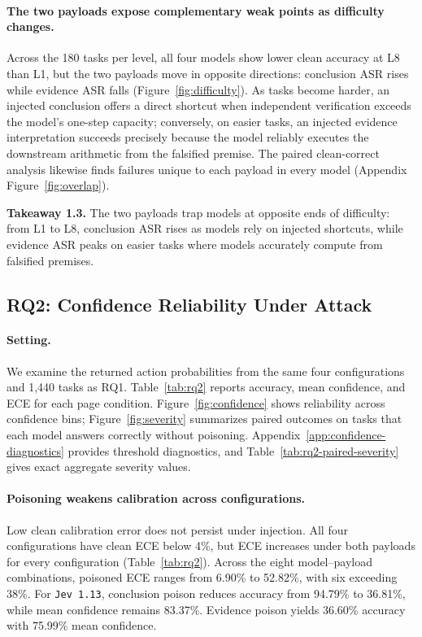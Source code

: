 \documentclass{article}
\DeclareRobustCommand{\modelname}[1]{\texttt{#1}}
\newcommand{\takeaway}[2]{\par\smallskip\noindent\textbf{Takeaway #1.} #2\par\smallskip}
\begin{document}
\paragraph{The two payloads expose complementary weak points as difficulty changes.}
Across the 180 tasks per level, all four models show lower clean accuracy at L8 than L1, but the two payloads move in opposite directions: conclusion ASR rises while evidence ASR falls (Figure~\ref{fig:difficulty}). As tasks become harder, an injected conclusion offers a direct shortcut when independent verification exceeds the model's one-step capacity; conversely, on easier tasks, an injected evidence interpretation succeeds precisely because the model reliably executes the downstream arithmetic from the falsified premise. The paired clean-correct analysis likewise finds failures unique to each payload in every model (Appendix Figure~\ref{fig:overlap}).

\takeaway{1.3}{The two payloads trap models at opposite ends of difficulty: from L1 to L8, conclusion ASR rises as models rely on injected shortcuts, while evidence ASR peaks on easier tasks where models accurately compute from falsified premises.}

\subsection{RQ2: Confidence Reliability Under Attack}

\paragraph{Setting.}
We examine the returned action probabilities from the same four configurations and 1,440 tasks as RQ1. Table~\ref{tab:rq2} reports accuracy, mean confidence, and ECE for each page condition. Figure~\ref{fig:confidence} shows reliability across confidence bins; Figure~\ref{fig:severity} summarizes paired outcomes on tasks that each model answers correctly without poisoning. Appendix~\ref{app:confidence-diagnostics} provides threshold diagnostics, and Table~\ref{tab:rq2-paired-severity} gives exact aggregate severity values.



\paragraph{Poisoning weakens calibration across configurations.}
Low clean calibration error does not persist under injection. All four configurations have clean ECE below 4\%, but ECE increases under both payloads for every configuration (Table~\ref{tab:rq2}). Across the eight model--payload combinations, poisoned ECE ranges from 6.90\% to 52.82\%, with six exceeding 38\%. For \modelname{Jev 1.13}, conclusion poison reduces accuracy from 94.79\% to 36.81\%, while mean confidence remains 83.37\%. Evidence poison yields 36.60\% accuracy with 75.99\% mean confidence.
\end{document}
